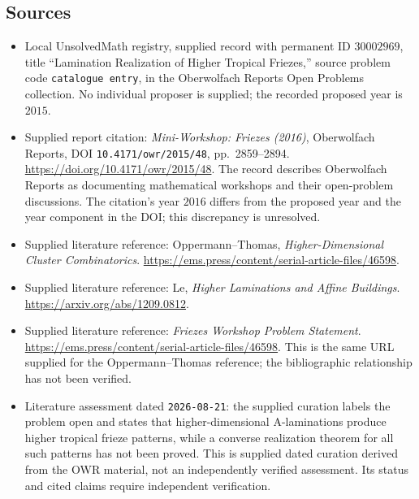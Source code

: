 \documentclass[11pt]{article}
\begin{document}
\subsection{Sources}
\begin{itemize}
\item Local UnsolvedMath registry, supplied record with permanent ID \(30002969\), title ``Lamination Realization of Higher Tropical Friezes,'' source problem code \texttt{catalogue entry}, in the Oberwolfach Reports Open Problems collection. No individual proposer is supplied; the recorded proposed year is \(2015\).
\item Supplied report citation: \emph{Mini-Workshop: Friezes (2016)}, Oberwolfach Reports, DOI \texttt{10.4171/owr/2015/48}, pp.\ 2859--2894. \url{https://doi.org/10.4171/owr/2015/48}. The record describes Oberwolfach Reports as documenting mathematical workshops and their open-problem discussions. The citation's year \(2016\) differs from the proposed year and the year component in the DOI; this discrepancy is unresolved.
\item Supplied literature reference: Oppermann--Thomas, \emph{Higher-Dimensional Cluster Combinatorics}. \url{https://ems.press/content/serial-article-files/46598}.
\item Supplied literature reference: Le, \emph{Higher Laminations and Affine Buildings}. \url{https://arxiv.org/abs/1209.0812}.
\item Supplied literature reference: \emph{Friezes Workshop Problem Statement}. \url{https://ems.press/content/serial-article-files/46598}. This is the same URL supplied for the Oppermann--Thomas reference; the bibliographic relationship has not been verified.
\item Literature assessment dated \texttt{2026-08-21}: the supplied curation labels the problem open and states that higher-dimensional A-laminations produce higher tropical frieze patterns, while a converse realization theorem for all such patterns has not been proved. This is supplied dated curation derived from the OWR material, not an independently verified assessment. Its status and cited claims require independent verification.
\end{itemize}
\end{document}
